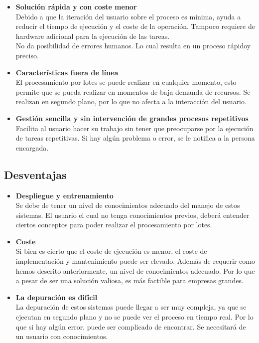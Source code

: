 \documentclass[12pt]{article}
\begin{document}
\begin{itemize}
    \item \textbf{Solución rápida y con coste menor}\\
    Debido a que la iteración del usuario sobre el proceso es mínima, ayuda a reducir el tiempo de ejecución y el coste de la operación. Tampoco
    requiere de hardware adicional para la ejecución de las tareas.
    \\ 
    No da posibilidad de errores humanos. Lo cual resulta en un proceso rápidoy preciso.

    \item \textbf{Características fuera de línea}\\
    El procesamiento por lotes se puede realizar en cualquier momento, esto permite que se pueda realizar en momentos de baja demanda de recursos.
    Se realizan en segundo plano, por lo que no afecta a la interacción del usuario.

    \item \textbf{Gestión sencilla y sin intervención de grandes procesos repetitivos}\\
    Facilita al usuario hacer su trabajo sin tener que preocuparse por la ejecución de tareas repetitivas. Si hay algún problema o error, se
    le notifica a la persona encargada.
\end{itemize}


\subsection{Desventajas}

\begin{itemize}
    \item \textbf{Despliegue y entrenamiento}\\
    Se debe de tener un nivel de conocimientos adecuado del manejo de estos sistemas. El usuario el cual no tenga conocimientos previos, deberá
    entender ciertos conceptos para poder realizar el procesamiento por lotes.

    \item \textbf{Coste}\\
    Si bien es cierto que el coste de ejecución es menor, el coste de implementación y mantenimiento puede ser elevado. Además de requerir como
    hemos descrito anteriormente, un nivel de conocimientos adecuado. Por lo que a pesar de ser una solución valiosa, es más factible para
    empresas grandes.

    \item \textbf{La depuración es difícil}\\
    La depuración de estos sistemas puede llegar a ser muy compleja, ya que se ejecutan en segundo plano y no se puede ver el proceso en tiempo
    real. Por lo que si hay algún error, puede ser complicado de encontrar. Se necesitará de un usuario con conocimientos.
\end{itemize}
\end{document}
